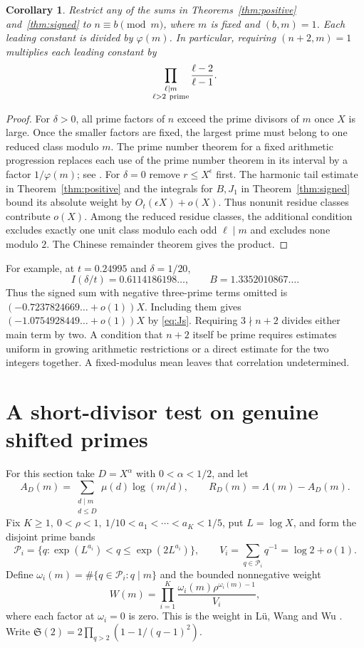 \documentclass[11pt]{article}
\newtheorem{corollary}[theorem]{Corollary}
\begin{document}
\begin{corollary}\label{cor:local}
Restrict any of the sums in Theorems~\ref{thm:positive}
and~\ref{thm:signed} to \(n\equiv b\pmod m\), where \(m\) is fixed
and \((b,m)=1\). Each leading constant is divided by \(\varphi(m)\).
In particular, requiring \((n+2,m)=1\) multiplies each leading
constant by
\[
       \prod_{\substack{\ell\mid m\\\ell>2\ {\rm prime}}}
                     \frac{\ell-2}{\ell-1}.
\]
\end{corollary}
\begin{proof}
For \(\delta>0\), all prime factors of \(n\) exceed the prime divisors
of \(m\) once \(X\) is large. Once the smaller factors are fixed, the
largest prime must belong to one reduced class modulo \(m\).
The prime number theorem for a fixed arithmetic progression replaces
each use of the prime number theorem in its interval by a factor
\(1/\varphi(m)\); see \cite{Tao}. For \(\delta=0\) remove \(r\le
X^\epsilon\) first. The harmonic tail estimate in
Theorem~\ref{thm:positive} and the integrals for \(B,J_1\) in
Theorem~\ref{thm:signed} bound its absolute weight by
\(O_t(\epsilon X)+o(X)\). Thus nonunit residue classes contribute
\(o(X)\). Among the reduced residue classes, the additional
condition excludes exactly one unit class modulo each odd
\(\ell\mid m\) and excludes none modulo \(2\). The Chinese
remainder theorem gives the product.
\end{proof}

For example, at \(t=0.24995\) and \(\delta=1/20\),
\[
  I(\delta/t)=0.6114186198\ldots,\qquad
  B=1.3352010867\ldots .
\]
Thus the signed sum with negative three-prime terms omitted is
\((-0.7237824669\ldots+o(1))X\). Including them gives
\((-1.0754928449\ldots+o(1))X\) by \eqref{eq:Js}.
Requiring \(3\nmid n+2\) divides either main term by two.
A condition that \(n+2\) itself be
prime requires estimates uniform in growing arithmetic restrictions
or a direct estimate for the two integers together. A fixed-modulus
mean leaves that correlation undetermined.


\section{A short-divisor test on genuine shifted primes}

For this section take \(D=X^\alpha\) with \(0<\alpha<1/2\), and let
\[
 A_D(m)=\sum_{\substack{d\mid m\\d\le D}}\mu(d)\log(m/d),
 \qquad R_D(m)=\Lambda(m)-A_D(m).
\]
Fix \(K\ge1,\ 0<\rho<1,\ 1/10<a_1<\cdots<a_K<1/5\),
put \(L=\log X\), and form the disjoint prime bands
\[
 \mathcal P_i=\{q:\exp(L^{a_i})<q\le\exp(2L^{a_i})\},
 \qquad V_i=\sum_{q\in\mathcal P_i}q^{-1}=\log2+o(1).
\]
Define \(\omega_i(m)=\#\{q\in\mathcal P_i:q\mid m\}\) and the
bounded nonnegative weight
\[
 W(m)=\prod_{i=1}^K\frac{\omega_i(m)\rho^{\omega_i(m)-1}}{V_i},
\]
where each factor at \(\omega_i=0\) is zero. This is the weight in
L\"u, Wang and Wu \cite[eqs.~(2.12)--(2.13)]{LWW}.
Write \(\mathfrak S(2)=2\prod_{q>2}(1-1/(q-1)^2)\).
\end{document}
